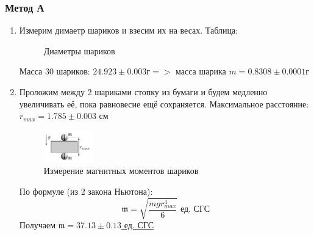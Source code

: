\documentclass[12pt,a4paper]{article}
\newcommand{\mk}{\mathfrak}
\begin{document}
\subsubsection{Метод А}
\begin{enumerate}
  \item Измерим димаетр шариков и взесим их на весах. Таблица:
  \begin{figure}[H]
    \label{tab:diametrs}
    \caption{Диаметры шариков}
  \end{figure}
  Масса 30 шариков: $24.923 \pm 0.003 \text{г} => $ масса шарика $m=0.8308 \pm 0.0001\text{г}$
  \item Проложим между 2 шариками стопку из бумаги и будем медленно увеличивать её, пока равновесие ещё сохраняется. Максимальное расстояние: $r_{max} = 1.785 \pm 0.003$ см
  \begin{figure}[H]
    \includegraphics*[width=0.2\textwidth]{2023-10-01-23-50-52.png}
    \caption{Измерение магнитных моментов шариков}
    \label{ust:met_a}
  \end{figure}
  По формуле \scriptsize(из 2 закона Ньютона)\normalsize:
  $$\mathfrak{m}=\sqrt{\frac{mgr^4_{max}}{6}} \text{ ед. СГС}$$
  Получаем \underline{$\mk m = 37.13 \pm 0.13$ ед. СГС}
\end{enumerate}
\end{document}
